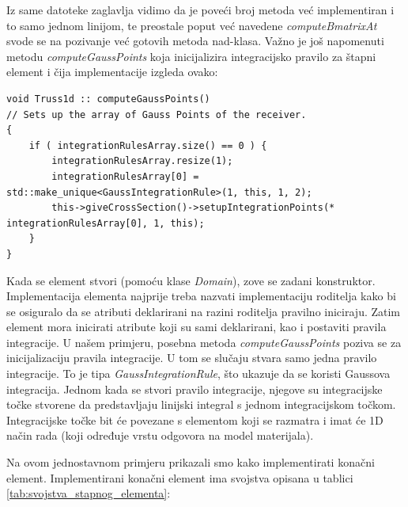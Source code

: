 \documentclass[a4paper,twoside,12pt]{memoir} %
\begin{document}
Iz same datoteke zaglavlja vidimo da je poveći broj metoda već implementiran i to samo jednom linijom, te preostale poput već navedene \textit{computeBmatrixAt} svode se na pozivanje već gotovih metoda nad-klasa. Važno je još napomenuti metodu \textit{computeGaussPoints} koja inicijalizira integracijsko pravilo za štapni element i čija implementacije izgleda ovako:

\begin{lstlisting}[caption={Inicijalizacija integracijskog pravila za štapni element}]
void Truss1d :: computeGaussPoints()
// Sets up the array of Gauss Points of the receiver.
{
    if ( integrationRulesArray.size() == 0 ) {
        integrationRulesArray.resize(1);
        integrationRulesArray[0] = std::make_unique<GaussIntegrationRule>(1, this, 1, 2);
        this->giveCrossSection()->setupIntegrationPoints(* integrationRulesArray[0], 1, this);
    }
}
\end{lstlisting}

Kada se element stvori (pomoću klase \textit{Domain}), zove se zadani konstruktor. Implementacija elementa najprije treba nazvati implementaciju roditelja kako bi se osiguralo da se atributi deklarirani na razini roditelja pravilno iniciraju. Zatim element mora inicirati atribute koji su sami deklarirani, kao i postaviti pravila integracije. U našem primjeru, posebna metoda \textit{computeGaussPoints} poziva se za inicijalizaciju pravila integracije. U tom se slučaju stvara samo jedna pravilo integracije. To je tipa \textit{GaussIntegrationRule}, što ukazuje da se koristi Gaussova integracija. Jednom kada se stvori pravilo integracije, njegove su integracijske točke stvorene da predstavljaju linijski integral s jednom integracijskom točkom. Integracijske točke bit će povezane s elementom koji se razmatra i imat će 1D način rada (koji određuje vrstu odgovora na model materijala).

Na ovom jednostavnom primjeru prikazali smo kako implementirati konačni element. Implementirani konačni element ima svojstva opisana u tablici \ref{tab:svojstva_stapnog_elementa}:
\end{document}
